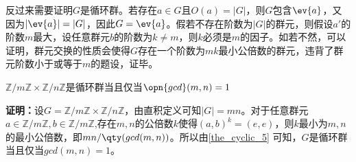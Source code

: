 反过来需要证明$G$是循环群。若存在$a\in G$且$O(a)=|G|$，则$G$包含$\ev{a}$，又因为$|\ev{a}|=|G|$，因此$G=\ev{a}$。假若不存在阶数为$|G|$的群元，则假设$a'$的阶数$m$最大，设任意群元$b$的阶数为$k\neq m$，则$k$必须是$m$的因子。如若不然，可以证明，群元交换的性质会使得$G$存在一个阶数为$mk$最小公倍数的群元，违背了群元阶数小于或等于$m$的题设，证毕。

\begin{corollary}{}
$\mathbb{Z} / m \mathbb{Z} \times \mathbb{Z} / n \mathbb{Z}$是循环群当且仅当$\opn{gcd}(m,n)=1$
\end{corollary}
\textbf{证明：}设$G=\mathbb{Z} / m \mathbb{Z} \times \mathbb{Z} / n \mathbb{Z}$，由直积定义可知$|G|=mn$。对于任意群元$a\in \mathbb{Z} / m \mathbb{Z},b\in \mathbb{Z} / m \mathbb{Z}$,存在$m,n$的公倍数$k$使得$(a,b)^k=(e,e)$，则$k$最小为$m,n$的最小公倍数，即$mn/\qty(gcd(m,n))$。所以由\autoref{the_cyclic_5}  可知，$G$是循环群当且仅当$gcd(m,n)=1$。